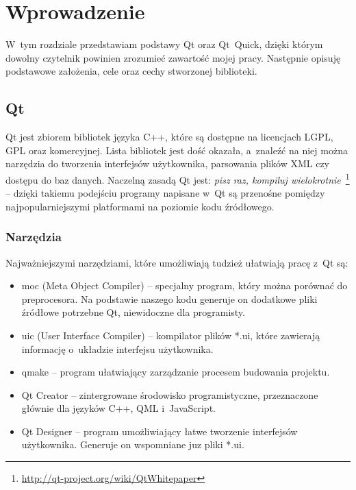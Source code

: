 \chapter{Wprowadzenie}
W~tym rozdziale przedstawiam podstawy Qt oraz Qt~Quick, dzięki którym dowolny czytelnik powinien zrozumieć zawartość mojej pracy. Następnie opisuję podstawowe założenia, cele oraz cechy stworzonej biblioteki.

\section{Qt}
Qt jest zbiorem bibliotek języka C++, które są dostępne na licencjach LGPL, GPL oraz komercyjnej. Lista bibliotek jest dość okazała, a~znaleźć na niej można narzędzia do tworzenia interfejsów użytkownika, parsowania plików XML czy dostępu do baz danych. Naczelną zasadą Qt jest: \textit{pisz raz, kompiluj wielokrotnie}~\footnote{\url{http://qt-project.org/wiki/QtWhitepaper}} -- dzięki takiemu podejściu programy napisane w~Qt są przenośne pomiędzy najpopularniejszymi platformami na poziomie kodu źródłowego.  


\subsection{Narzędzia}
Najważniejszymi narzędziami, które umożliwiają tudzież ułatwiają pracę z~Qt są:
\begin{itemize}
\item moc (Meta Object Compiler) -- specjalny program, który można porównać do preprocesora. Na podstawie naszego kodu generuje on dodatkowe pliki źródłowe potrzebne Qt, niewidoczne dla programisty.
\item uic (User Interface Compiler) -- kompilator plików *.ui, które zawierają informację o~układzie interfejsu użytkownika.
\item qmake -- program ułatwiający zarządzanie procesem budowania projektu.
\item Qt Creator -- zintergrowane środowisko programistyczne, przeznaczone głównie dla języków C++, QML i~JavaScript.
\item Qt Designer -- program umożliwiający łatwe tworzenie interfejsów użytkownika. Generuje on wspomniane juz pliki *.ui.
\end{itemize}


